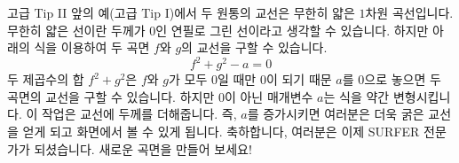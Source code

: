 ﻿\begin{surferPage}{고급 Tip II}
앞의 예(고급 Tip I)에서 두 원통의 교선은 무한히 얇은 $1$차원 곡선입니다. 무한히 얇은 선이란 두께가 $0$인 연필로 그린 선이라고 생각할 수 있습니다. 하지만 아래의 식을 이용하여 두 곡면 $f$와 $g$의 교선을 구할 수 있습니다. 
\[ f^2+g^2-a=0\]
두 제곱수의 합 $f^2+g^2$은 $f$와 $g$가 모두 0일 때만 0이 되기 때문 $a$를 $0$으로 놓으면 두 곡면의 교선을 구할 수 있습니다. 하지만 0이 아닌 매개변수 $a$는 식을 약간 변형시킵니다. 이 작업은 교선에 두께를 더해줍니다. 즉, $a$를 증가시키면 여러분은 더욱 굵은 교선을 얻게 되고 화면에서 볼 수 있게 됩니다. 
\newline \newline
축하합니다, 여러분은 이제 SURFER 전문가가 되셨습니다. 새로운 곡면을 만들어 보세요!
\end{surferPage}
